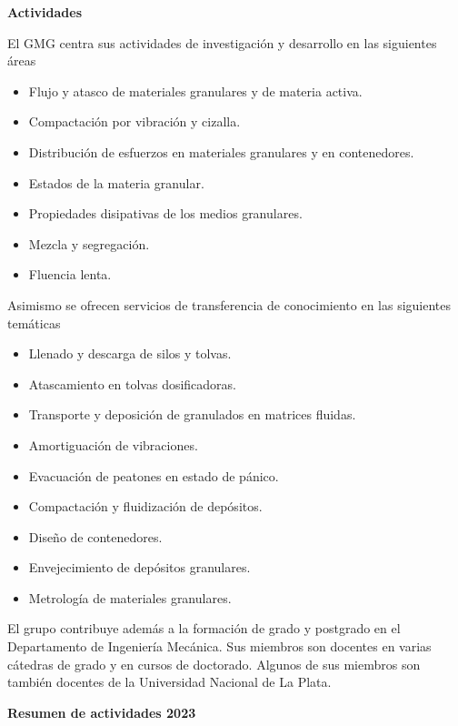 \documentclass[a4paper,11pt,twoside,final,titlepage,onecolumn,openright]{report}
\begin{document}
\vspace{0.5cm}
{\bf Actividades}
\vspace{0.5cm}

El GMG centra sus actividades de investigación y desarrollo en las siguientes áreas

\begin{itemize}
 \item Flujo y atasco de materiales granulares y de materia activa.
 \item Compactación por vibración y cizalla.
 \item Distribución de esfuerzos en materiales granulares y en contenedores.
 \item Estados de la materia granular.
 \item Propiedades disipativas de los medios granulares.
 \item Mezcla y segregación.
 \item Fluencia lenta.
\end{itemize}

Asimismo se ofrecen servicios de transferencia de conocimiento en las siguientes temáticas

\begin{itemize}
 \item Llenado y descarga de silos y tolvas.
 \item Atascamiento en tolvas dosificadoras.
 \item Transporte y deposición de granulados en matrices fluidas.
 \item Amortiguación de vibraciones.
 \item Evacuación de peatones en estado de pánico.
 \item Compactación y fluidización de depósitos.
 \item Diseño de contenedores.
 \item Envejecimiento de depósitos granulares.
 \item Metrología de materiales granulares.
\end{itemize}

El grupo contribuye además a la formación de grado y postgrado en el Departamento de Ingeniería Mecánica. Sus miembros son docentes en varias cátedras de grado y en cursos de doctorado. Algunos de sus miembros son también docentes de la Universidad Nacional de La Plata.

\vspace{0.5cm}

{\bf Resumen de actividades 2023}
\end{document}
